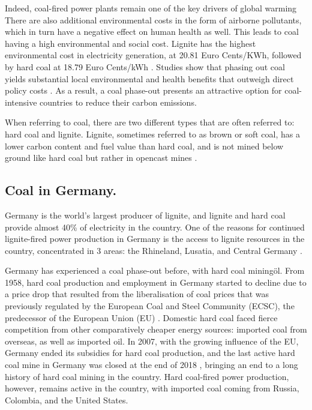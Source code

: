 \documentclass[12pt,onecolumn,twoside]{layout}
\begin{document}
Indeed, coal-fired power plants remain one of the key drivers of global warming \citep{Edwards2019,Zhao2019} There are also  additional environmental costs in the form of airborne pollutants, which in turn have a negative effect on human health as well. This leads to coal having a high environmental and social cost. Lignite has the highest environmental cost in electricity generation, at 20.81 Euro Cents/KWh, followed by hard coal at 18.79 Euro Cents/kWh \citep{Oei2020}. Studies show that phasing out coal yields substantial local environmental and health benefits that outweigh direct policy costs \citep{Rauner2020}. As a result, a coal phase-out presents an attractive option for coal-intensive countries to reduce their carbon emissions.

When referring to coal, there are two different types that are often referred to: hard coal and lignite. Lignite, sometimes referred to as brown or soft coal, has a lower carbon content and fuel value than hard coal, and is not mined below ground like hard coal but rather in opencast mines \citep{Appunn2019}.

\subsection*{Coal in Germany.}
Germany is the world's largest producer of lignite, and lignite and hard coal provide almost 40\% of electricity in the country. One of the reasons for continued lignite-fired power production in Germany is the access to lignite resources in the country, concentrated in 3 areas: the Rhineland, Lusatia, and Central Germany \citep{AgoraEnergiewende2019}.

Germany has experienced a coal phase-out before, with hard coal miningöl. From 1958, hard coal production and employment in Germany started to decline due to a price drop that resulted from the liberalisation of coal prices that was previously regulated by the European Coal and Steel Community (ECSC), the predecessor of the European Union (EU) \citep{Oei2019}. Domestic hard coal faced fierce competition from other comparatively cheaper energy sources: imported coal from overseas, as well as imported oil.  In 2007, with the growing influence of the EU, Germany ended its subsidies for hard coal production, and the last active hard coal mine in Germany was closed at the end of 2018 \citep{Appunn2018}, bringing an end to a long history of hard coal mining in the country. Hard coal-fired power production, however, remains active in the country, with imported coal coming from Russia, Colombia, and the United States. 
\end{document}
